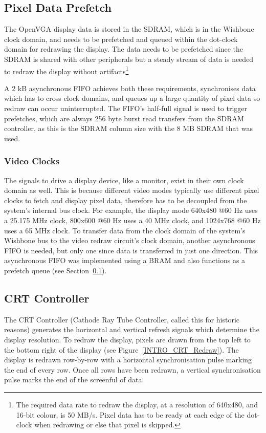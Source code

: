 \subsection{Pixel Data Prefetch}
\label{VID_Prefetch}

The OpenVGA display data is stored in the SDRAM, which is in the Wishbone clock
domain, and needs to be prefetched and queued within the dot-clock domain for
redrawing the display. The data needs to be prefetched since the SDRAM is shared
with other peripherals but a steady stream of data is needed to redraw the
display without artifacts\footnote{The required data rate to redraw the display,
at a resolution of 640x480, and 16-bit colour, is 50 MB/s. Pixel data has to be
ready at each edge of the dot-clock when redrawing or else that pixel is
skipped.}

A 2 kB asynchronous FIFO achieves both these requirements, synchronises data
which has to cross clock domains, and queues up a large quantity of pixel data so
redraw can occur uninterrupted. The FIFO's half-full signal is used to trigger
prefetches, which are always 256 byte burst read transfers from the SDRAM
controller, as this is the SDRAM column size with the 8 MB SDRAM that was used.


\subsubsection{Video Clocks}
The signals to drive a display device, like a monitor, exist in their own clock
domain as well. This is because different video modes typically use different
pixel clocks to fetch and display pixel data, therefore has to be decoupled from
the system's internal bus clock. For example, the display mode 640x480 @60 Hz
uses a 25.175 MHz clock, 800x600 @60 Hz uses a 40 MHz clock, and 1024x768 @60 Hz uses
a 65 MHz clock. To transfer data from the clock domain of the system's Wishbone
bus to the video redraw circuit's clock domain, another asynchronous FIFO is
needed, but only one since data is transferred in just one direction. This
asynchronous FIFO was implemented using a BRAM and also functions as a prefetch
queue (see Section~\ref{VID_Prefetch}).


\subsection{CRT Controller}
\label{VID_CRTC}

The CRT Controller (Cathode Ray Tube Controller, called this for historic
reasons) generates the horizontal and vertical refresh signals which determine
the display resolution. To redraw the display, pixels are drawn from the top
left to the bottom right of the display\cite{VGA_Programmers} (see
Figure~\ref{INTRO_CRT_Redraw}). The display is redrawn row-by-row with a
horizontal synchronisation pulse marking the end of every row. Once all rows have
been redrawn, a vertical synchronisation pulse marks the end of the screenful of
data.

